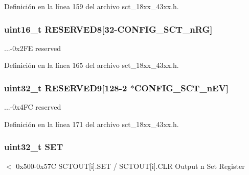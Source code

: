 Definición en la línea 159 del archivo sct\+\_\+18xx\+\_\+43xx.\+h.

\subsubsection[{\texorpdfstring{R\+E\+S\+E\+R\+V\+E\+D8}{RESERVED8}}]{\setlength{\rightskip}{0pt plus 5cm}uint16\+\_\+t R\+E\+S\+E\+R\+V\+E\+D8\mbox{[}32-\/{\bf C\+O\+N\+F\+I\+G\+\_\+\+S\+C\+T\+\_\+n\+RG}\mbox{]}}\hypertarget{struct_l_p_c___s_c_t___t_a997c0a13cc0ccf7886f11696ba5b306f}{}\label{struct_l_p_c___s_c_t___t_a997c0a13cc0ccf7886f11696ba5b306f}
...-\/0x2\+FE reserved 

Definición en la línea 165 del archivo sct\+\_\+18xx\+\_\+43xx.\+h.

\subsubsection[{\texorpdfstring{R\+E\+S\+E\+R\+V\+E\+D9}{RESERVED9}}]{\setlength{\rightskip}{0pt plus 5cm}uint32\+\_\+t R\+E\+S\+E\+R\+V\+E\+D9\mbox{[}128-\/2 $\ast${\bf C\+O\+N\+F\+I\+G\+\_\+\+S\+C\+T\+\_\+n\+EV}\mbox{]}}\hypertarget{struct_l_p_c___s_c_t___t_a31c21ff0f08363ff8bf00ece210e7a1c}{}\label{struct_l_p_c___s_c_t___t_a31c21ff0f08363ff8bf00ece210e7a1c}
...-\/0x4\+FC reserved 

Definición en la línea 171 del archivo sct\+\_\+18xx\+\_\+43xx.\+h.

\subsubsection[{\texorpdfstring{S\+ET}{SET}}]{\setlength{\rightskip}{0pt plus 5cm}uint32\+\_\+t S\+ET}\hypertarget{struct_l_p_c___s_c_t___t_aeae4bcc387d26703db6e5e8e5aa26ae9}{}\label{struct_l_p_c___s_c_t___t_aeae4bcc387d26703db6e5e8e5aa26ae9}
$<$ 0x500-\/0x57C S\+C\+T\+O\+UT\mbox{[}i\mbox{]}.S\+ET / S\+C\+T\+O\+UT\mbox{[}i\mbox{]}.C\+LR Output n Set Register 

